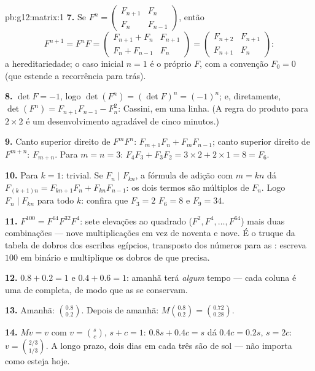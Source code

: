 \begin{solution}{pb:g12:matrix:1}
\textbf{7.} Se $F^n = \begin{pmatrix} F_{n+1} & F_n\\ F_n &
F_{n-1}\end{pmatrix}$, então
\[
F^{n+1} = F^n F =
\begin{pmatrix} F_{n+1} + F_n & F_{n+1}\\
F_n + F_{n-1} & F_n \end{pmatrix}
= \begin{pmatrix} F_{n+2} & F_{n+1}\\ F_{n+1} & F_n
\end{pmatrix} :
\]
a hereditariedade; o caso inicial $n = 1$ é o próprio $F$, com
a convenção $F_0 = 0$ (que estende a recorrência para trás).

\textbf{8.} $\det F = -1$, logo
$\det(F^n) = (\det F)^n = (-1)^n$; e, diretamente,
$\det(F^n) = F_{n+1}F_{n-1} - F_n^2$: Cassini, em uma linha. (A
regra do produto para  $2 \times 2$ é um
desenvolvimento agradável de cinco minutos.)

\textbf{9.} Canto superior direito de $F^m F^n$:
$F_{m+1}F_n + F_m F_{n-1}$; canto superior direito de
$F^{m+n}$: $F_{m+n}$. Para $m = n = 3$:
$F_4 F_3 + F_3 F_2 = 3 \times 2 + 2 \times 1 = 8 = F_6$.

\textbf{10.} Para $k = 1$: trivial. Se $F_n \mid F_{kn}$, a
fórmula de adição com $m = kn$ dá
$F_{(k+1)n} = F_{kn+1}F_n + F_{kn}F_{n-1}$: os dois termos são
múltiplos de $F_n$. Logo $F_n \mid F_{kn}$ para todo $k$:
confira que $F_3 = 2$  $F_6 = 8$ e $F_9 = 34$.

\textbf{11.} $F^{100} = F^{64} F^{32} F^4$: sete elevações ao
quadrado ($F^2, F^4, \dots, F^{64}$) mais duas combinações ---
nove multiplicações em vez de noventa e nove. É o truque da
tabela de dobros dos escribas egípcios, transposto dos números
para as : escreva $100$ em binário e multiplique os
dobros de que precisa.

\textbf{12.} $0.8 + 0.2 = 1$ e $0.4 + 0.6 = 1$: amanhã terá
\emph{algum} tempo --- cada coluna é uma  de
 completa, de modo que as  se
conservam.

\textbf{13.} Amanhã: $\binom{0.8}{0.2}$. Depois de amanhã:
$M\binom{0.8}{0.2} = \binom{0.72}{0.28}$.

\textbf{14.} $Mv = v$ com $v = \binom{s}{c}$, $s + c = 1$:
$0.8s + 0.4c = s$ dá $0.4c = 0.2s$, $s = 2c$:
$v = \binom{2/3}{1/3}$. A longo prazo, dois dias em cada três
são de sol --- não importa como esteja hoje.


\end{solution}
